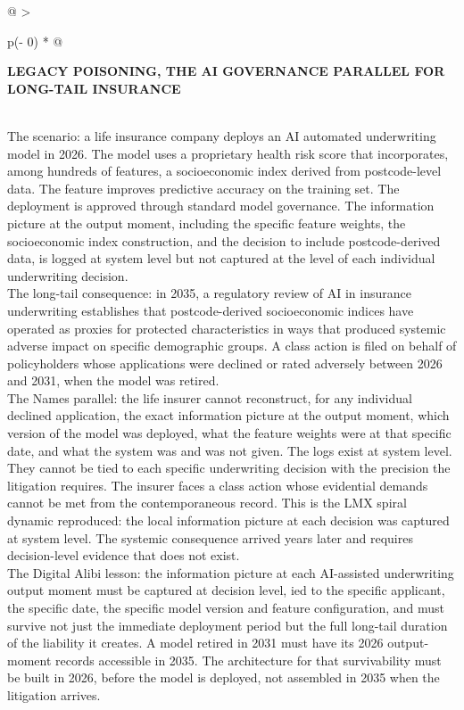 \begin{longtable}[]{@{}
  >{\raggedright\arraybackslash}p{(\columnwidth - 0\tabcolsep) * }@{}}
\toprule\noalign{}
\begin{minipage}[b]{\linewidth}\raggedright
\textbf{LEGACY POISONING, THE AI GOVERNANCE PARALLEL FOR LONG-TAIL INSURANCE}
\end{minipage} \\
\midrule\noalign{}
\endhead
\bottomrule\noalign{}
\endlastfoot
The scenario: a life insurance company deploys an AI automated underwriting model in 2026. The model uses a proprietary health risk score that incorporates, among hundreds of features, a socioeconomic index derived from postcode-level data. The feature improves predictive accuracy on the training set. The deployment is approved through standard model governance. The information picture at the output moment, including the specific feature weights, the socioeconomic index construction, and the decision to include postcode-derived data, is logged at system level but not captured at the level of each individual underwriting decision. \\
The long-tail consequence: in 2035, a regulatory review of AI in insurance underwriting establishes that postcode-derived socioeconomic indices have operated as proxies for protected characteristics in ways that produced systemic adverse impact on specific demographic groups. A class action is filed on behalf of policyholders whose applications were declined or rated adversely between 2026 and 2031, when the model was retired. \\
The Names parallel: the life insurer cannot reconstruct, for any individual declined application, the exact information picture at the output moment, which version of the model was deployed, what the feature weights were at that specific date, and what the system was and was not given. The logs exist at system level. They cannot be tied to each specific underwriting decision with the precision the litigation requires. The insurer faces a class action whose evidential demands cannot be met from the contemporaneous record. This is the LMX spiral dynamic reproduced: the local information picture at each decision was captured at system level. The systemic consequence arrived years later and requires decision-level evidence that does not exist. \\
The Digital Alibi lesson: the information picture at each AI-assisted underwriting output moment must be captured at decision level, ied to the specific applicant, the specific date, the specific model version and feature configuration, and must survive not just the immediate deployment period but the full long-tail duration of the liability it creates. A model retired in 2031 must have its 2026 output-moment records accessible in 2035. The architecture for that survivability must be built in 2026, before the model is deployed, not assembled in 2035 when the litigation arrives. \\
\end{longtable}


